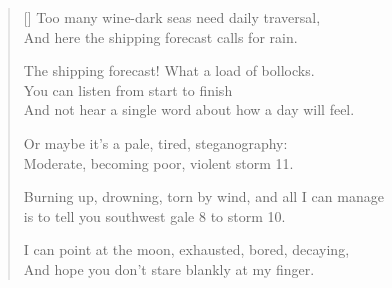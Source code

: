 \begin{verse}[\textwidth]
  Too many wine-dark seas need daily traversal,\\
  And here the shipping forecast calls for rain.

  The shipping forecast! What a load of bollocks.\\
  You can listen from start to finish\\
  And not hear a single word about how a day will feel.

  Or maybe it's a pale, tired, steganography:\\
  Moderate, becoming poor, violent storm 11.

  Burning up, drowning, torn by wind, and all I can manage\\
  is to tell you southwest gale 8 to storm 10.

  I can point at the moon, exhausted, bored, decaying,\\
  And hope you don't stare blankly at my finger.
\end{verse}
